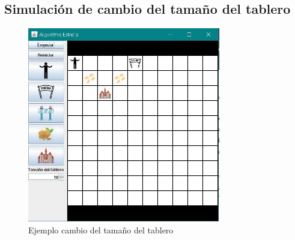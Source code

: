 \documentclass[12pt]{article}
\begin{document}
\subsection{Simulación de cambio del tamaño del tablero}
\begin{figure}[H]
    \centering
    \includegraphics[width=0.75\textwidth]{SimulacionTablero.JPG}
    \caption{Ejemplo cambio del tamaño del tablero}
\end{figure}
\newpage
\end{document}
